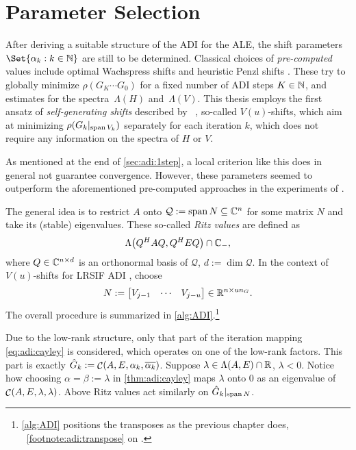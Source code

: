 \section{Parameter Selection}
\label{sec:adi:parameters}

After deriving a suitable structure of the \ac{ADI} for the \ac{ALE},
the shift parameters $\Set{\alpha_k : k\in\N}$ are still to be determined.
Classical choices of \emph{pre-computed} values include
optimal Wachspress shifts \cite{Wachspress1992,Wachspress2013} and
heuristic Penzl shifts \cite{Penzl1999}.
These try to globally minimize $\rho(G_K \cdots G_0)$ for a fixed number of \ac{ADI} steps $K\in\mathbb{N}$,
and estimates for the spectra~$\Lambda(H)$ and~$\Lambda(V)$.
This thesis employs the first ansatz of \emph{self-generating shifts} described by \citeauthor{Kuerschner2016}~\cite[Section~5.3]{Kuerschner2016},
so-called $V(u)$-shifts,
which aim at minimizing
$\rho(G_k |_{\operatorname{span} V_k})$
separately for each iteration $k$,
which does not require any information on the spectra of $H$ or $V$.

As mentioned at the end of \autoref{sec:adi:1step},
a local criterion like this does in general not guarantee convergence.
However, these parameters seemed to outperform the aforementioned pre-computed approaches in the experiments of \cite{Kuerschner2016}.

The general idea is to restrict $A$ onto
$\mathcal Q := \operatorname{span} N \subseteq \mathbb{C}^n$
for some matrix $N$ and take its (stable) eigenvalues.
These so-called \emph{Ritz values} are defined as
\begin{equation}
  \Lambda\big( Q^H A Q, Q^H E Q \big) \cap \mathbb{C}_-
  ,
\end{equation}
where $Q\in\mathbb{C}^{n\times d}$ is an orthonormal basis of $\mathcal Q$, $d := \dim\mathcal Q$.
In the context of $V(u)$-shifts for \ac{LRSIF} \ac{ADI} \cite{Lang2015}, choose
\begin{equation}
  N := \begin{bmatrix}
    V_{j-1} &
    \cdots &
    V_{j-u}
  \end{bmatrix}
  \in \mathbb{R}^{n\times u n_G}
  .
\end{equation}
The overall procedure is summarized in \autoref{alg:ADI}.\footnote{%
  \autoref{alg:ADI} positions the transposes as the previous chapter does,
  \cf~\autoref{footnote:adi:transpose} on .
}

\begin{remark}
  Due to the low-rank structure, only that part of the iteration mapping \eqref{eq:adi:cayley} is considered,
  which operates on one of the low-rank factors.
  This part is exactly \mbox{$\hat G_k := \Cayley(A, E, \alpha_k, \conj{\alpha_k})$}.
  Suppose $\lambda \in \Lambda(A, E) \cap \mathbb{R}$, $\lambda < 0$.
  Notice how choosing $\alpha = \beta := \lambda$ in \autoref{thm:adi:cayley}
  maps $\lambda$ onto $0$ as an eigenvalue of $\mathop{\mathcal{C}}(A, E, \lambda, \lambda)$.
  Above Ritz values act similarly on $\hat G_k |_{\operatorname{span} N}$.
\end{remark}

